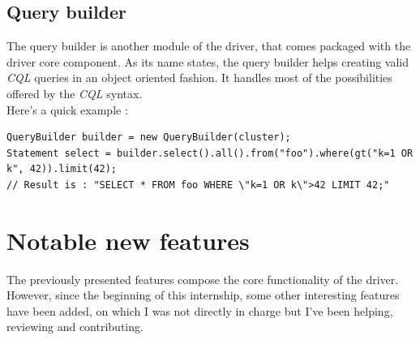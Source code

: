 \documentclass[a4paper]{report}
\begin{document}
\subsection{Query builder}
The query builder is another module of the driver, that comes packaged with the driver core component. As its name states, the query builder helps creating valid \emph{CQL} queries in an object oriented fashion. It handles most of the possibilities offered by the \emph{CQL} syntax.\\
Here's a quick example : 
\begin{lstlisting}[label=qb-ex-1, caption=Query Builder example, style=Java]
QueryBuilder builder = new QueryBuilder(cluster);
Statement select = builder.select().all().from("foo").where(gt("k=1 OR k", 42)).limit(42);
// Result is : "SELECT * FROM foo WHERE \"k=1 OR k\">42 LIMIT 42;"
\end{lstlisting}
\newpage


\section{Notable new features}
The previously presented features compose the core functionality of the driver. However, since the beginning of this internship, some other interesting features have been added, on which I was not directly in charge but I've been helping, reviewing and contributing.
\end{document}
